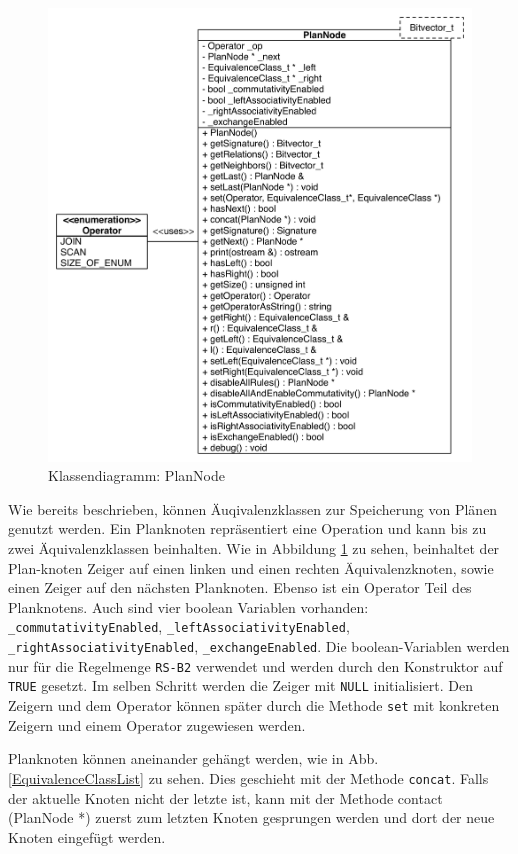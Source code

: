 \begin{figure}[ht]
  \centering
  \includegraphics[scale=0.75]{04_Implementierung/00_media/PlanNodeClass.pdf}
  \caption{Klassendiagramm: PlanNode}
  \label{PlanNodeClass}
\end{figure}

Wie bereits beschrieben, können Äuqivalenzklassen zur Speicherung von Plänen genutzt werden. Ein Planknoten repräsentiert eine Operation und kann bis zu zwei Äquivalenzklassen beinhalten. Wie in Abbildung \ref{PlanNodeClass} zu sehen, beinhaltet der Plan-knoten Zeiger auf einen linken und einen rechten Äquivalenzknoten, sowie einen Zeiger auf den nächsten Planknoten. Ebenso ist ein Operator Teil des Planknotens. Auch sind vier boolean Variablen vorhanden: \texttt{\_commutativity\-Enabled}, \texttt{\_left\-Associativity\-Enabled},  \texttt{\_right\-Associativity\-Enabled},  \texttt{\_exchange\-Enabled}. Die boo\-lean-Variablen werden nur für die Regelmenge \texttt{RS-B2} verwendet und werden durch den Konstruktor auf \texttt{TRUE} gesetzt. Im selben Schritt werden die Zeiger mit \texttt{NULL} initialisiert. Den Zeigern und dem Operator können später durch die Methode \texttt{set} mit konkreten Zeigern und einem Operator zugewiesen werden.

Planknoten können aneinander gehängt werden, wie in Abb. \ref{EquivalenceClassList} zu sehen. Dies geschieht mit der Methode \texttt{concat}. Falls der aktuelle Knoten nicht der letzte ist, kann mit der Methode contact (PlanNode *) zuerst zum letzten Knoten gesprungen werden und dort der neue Knoten eingefügt werden. 

